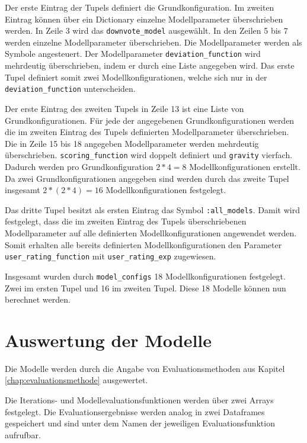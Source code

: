 Der erste Eintrag der Tupels definiert die Grundkonfiguration. Im zweiten Eintrag können über ein Dictionary einzelne Modellparameter überschrieben werden. In Zeile 3 wird das \texttt{downvote\_model} ausgewählt. In den Zeilen 5 bis 7 werden einzelne Modellparameter überschrieben. Die Modellparameter werden als Symbole angesteuert. Der Modellparameter \texttt{deviation\_function} wird mehrdeutig überschrieben, indem er durch eine Liste angegeben wird. Das erste Tupel definiert somit zwei Modellkonfigurationen, welche sich nur in der \texttt{deviation\_function} unterscheiden. 

Der erste Eintrag des zweiten Tupels in Zeile 13 ist eine Liste von Grundkonfigurationen. Für jede der angegebenen Grundkonfigurationen werden die im zweiten Eintrag des Tupels definierten Modellparameter überschrieben. Die in Zeile 15 bis 18 angegeben Modellparameter werden mehrdeutig überschrieben. \texttt{scoring\_function} wird doppelt definiert und \texttt{gravity} vierfach. Dadurch werden pro Grundkonfiguration $2 * 4 = 8$ Modellkonfigurationen erstellt. Da zwei Grundkonfigurationen angegeben sind werden durch das zweite Tupel insgesamt $2 * (2* 4) = 16$ Modellkonfigurationen festgelegt. 

Das dritte Tupel besitzt als ersten Eintrag das Symbol \texttt{:all\_models}. Damit wird festgelegt, dass die im zweiten Eintrag des Tupels überschriebenen Modellparameter auf alle definierten Modellkonfigurationen angewendet werden.
Somit erhalten alle bereits definierten Modellkonfigurationen den Parameter \texttt{user\_rating\_function} mit \texttt{user\_rating\_exp} zugewiesen.

Insgesamt wurden durch \texttt{model\_configs} 18 Modellkonfigurationen festgelegt. Zwei im ersten Tupel und 16 im zweiten Tupel. Diese 18 Modelle können nun berechnet werden.


\section{Auswertung der Modelle}

Die Modelle werden durch die Angabe von Evaluationsmethoden aus Kapitel \ref{chap:evaluationsmethode} ausgewertet.

Die Iterations- und Modellevaluationsfunktionen werden über zwei Arrays festgelegt. Die Evaluationsergebnisse werden analog in zwei Dataframes gespeichert und sind unter dem Namen der jeweiligen Evaluationsfunktion aufrufbar.

